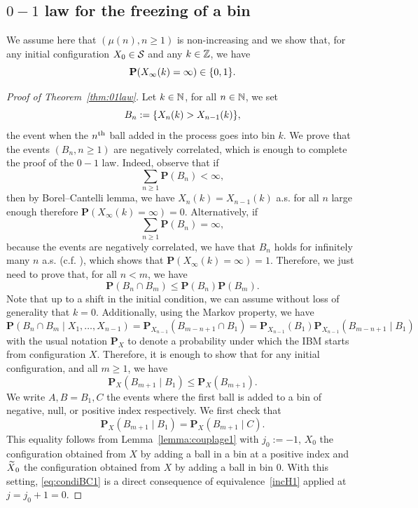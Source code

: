 \documentclass[AHL,Unicode,longabstracts,published]{cedram}
\newcommand{\bbN}{\mathbb{N}}
\newcommand{\Z}{\mathbb{Z}}
\renewcommand{\P}{\mathbf{P}}
\renewcommand{\S}{\mathcal{S}}
\let\originalleft\left
\let\originalright\right
\renewcommand{\left}{\mathopen{}\mathclose\bgroup\originalleft}
\renewcommand{\right}{\aftergroup\egroup\originalright}
\let\oldin\in
\renewcommand{\in}{\mathchoice{\oldin}{\oldin}{\,\oldin\,}{\,\oldin\,}}
\let\oldtilde\tilde
\renewcommand*{\tilde}[1]{\mathchoice{\widetilde{#1}}{\widetilde{#1}}{\oldtilde{#1}}{\oldtilde{#1}}}
\newcommand{\Z}{\mathbb{Z}}
\begin{document}
\subsection{\texorpdfstring{$0-1$}{0-1} law for the freezing of a bin}

We assume here that $(\mu(n), n \geq 1)$ is non-increasing and we show that, for any initial configuration $X_0 \in \S$ and any $k\in \Z$, we have
\begin{equation*}
\P(X_\infty(k) = \infty) \in \{0, 1\}.
\end{equation*}
\begin{proof}[Proof of Theorem~\ref{thm:01law}]
Let $k \in \bbN$, for all $n \in \bbN$, we set
\[
B_n
:= \left\{ X_{n}(k) > X_{n-1}(k)\right\},
\]
the event when the $n^{\rm th}$ ball added in the process goes into bin $k$. We prove that the events $(B_n, n \geq 1)$ are negatively correlated, which is enough to complete the proof of the $0-1$ law. Indeed, observe that if
\[
\sum_{n \geq 1} \P(B_n) < \infty,
\]
then by Borel--Cantelli lemma, we have $X_n(k) = X_{n-1}(k)$ a.s. for all $n$ large enough therefore $\P(X_\infty(k) = \infty) = 0$. Alternatively, if
\[
\sum_{n \geq 1} \P(B_n) = \infty,
\]
because the events are negatively correlated, we have that $B_n$ holds for infinitely many $n$ a.s. (c.f. \cite{KochenStone64}), which shows that $\P(X_\infty(k) = \infty) = 1$. Therefore, we just need to prove that, for all $n < m$, we have
\[
\P(B_n \cap B_m) \leq \P(B_n)\P(B_m).
\]
Note that up to a shift in the initial condition, we can assume without loss of generality that $k=0$. Additionally, using the Markov property, we have
\[
\P(B_n \cap B_m\mid X_1,\ldots, X_{n-1}) = \P_{X_{n-1}}(B_{m-n+1} \cap B_1) = \P_{X_{n-1}}(B_1) \P_{X_{n-1}}(B_{m-n+1}\mid B_1)
\]
with the usual notation $\P_X$ to denote a probability under which the IBM starts from configuration $X$. Therefore, it is enough to show that for any initial configuration, and all $m \geq 1$, we have
\begin{equation}\label{eq:01negcor}
\P_{X}(B_{m+1}\mid B_1) \leq \P_{X}(B_{m+1}).
\end{equation}
We write $A, B=B_1, C$ the events where the first ball is added to a bin of negative, null, or positive index respectively. We first check that
\begin{equation}\label{eq:condiBC1}
\P_{X}(B_{m+1}\mid B_1) = \P_{X}(B_{m+1}\mid C).
\end{equation}
This equality follows from Lemma~\ref{lemma:couplage1} with $j_0
:= -1$, $X_0$ the configuration obtained from $X$ by adding a ball in a bin at a positive index and $\tilde{X}_0$ the configuration obtained from $X$ by adding a ball in bin $0$. With this setting, \eqref{eq:condiBC1} is a direct consequence of equivalence~\eqref{incH1} applied at $j = j_0 + 1 = 0$.


\end{proof}
\end{document}
